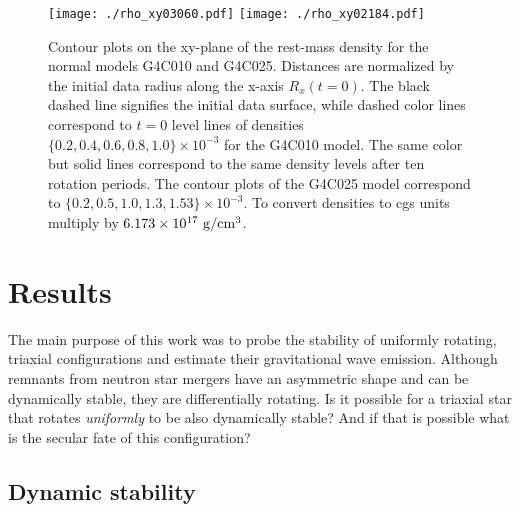 \documentclass[twocolumn,superscriptaddress,showpacs,prd,aps,amsmath,amssymb,nofootinbib]{revtex4-1}
\begin{document}
\begin{figure*}
\begin{center}
\texttt{[image: ./rho\_xy03060.pdf]}
%
\texttt{[image: ./rho\_xy02184.pdf]}
\caption{Contour plots on the xy-plane of the rest-mass density for the normal models 
G4C010 and G4C025. Distances are normalized by the initial data radius along the x-axis $R_x(t=0)$.
The black dashed line signifies the initial data surface, while dashed color lines correspond to $t=0$
level lines of densities $\{0.2, 0.4, 0.6, 0.8, 1.0\}\times 10^{-3}$ 
for the G4C010 model. The same color 
but solid lines correspond to the same density levels after ten rotation periods. The contour plots of the 
G4C025 model correspond to $\{0.2, 0.5, 1.0, 1.3, 1.53\}\times 10^{-3}$.
To convert densities to cgs units multiply by $6.173\times 10^{17}\ {\rm g/cm^3}$.
}  
\label{fig:radii1}
\end{center}
\end{figure*}




\section{Results}
\label{sec:results}     

The main purpose of this work was to probe the stability of uniformly rotating, triaxial
configurations and estimate their gravitational wave emission. 
Although remnants from neutron star mergers have an asymmetric shape and can be dynamically
stable, they are differentially rotating. Is it possible for a triaxial star that
rotates \textit{uniformly} to be also dynamically stable? And if that is possible what is the
secular fate of this configuration? 


\subsection{Dynamic stability}
\label{sec:dynsta}
\end{document}
